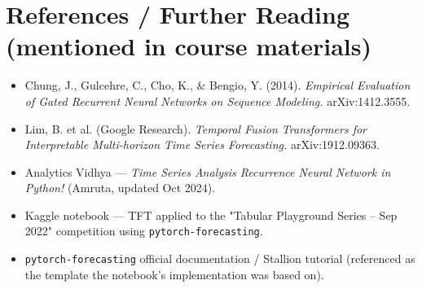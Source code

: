 \documentclass[12pt,openany]{book}
\theoremstyle{definition}
\theoremstyle{remark}
\begin{document}
\section{References / Further Reading (mentioned in course materials)}

\begin{itemize}
\item Chung, J., Gulcehre, C., Cho, K., \& Bengio, Y. (2014). \emph{Empirical Evaluation of Gated Recurrent Neural Networks on Sequence Modeling.} arXiv:1412.3555.
\item Lim, B. et al. (Google Research). \emph{Temporal Fusion Transformers for Interpretable Multi-horizon Time Series Forecasting.} arXiv:1912.09363.
\item Analytics Vidhya --- \emph{Time Series Analysis Recurrence Neural Network in Python!} (Amruta, updated Oct 2024).
\item Kaggle notebook --- TFT applied to the "Tabular Playground Series -- Sep 2022" competition using \texttt{pytorch-forecasting}.
\item \texttt{pytorch-forecasting} official documentation / Stallion tutorial (referenced as the template the notebook's implementation was based on).

\end{itemize}
\end{document}
